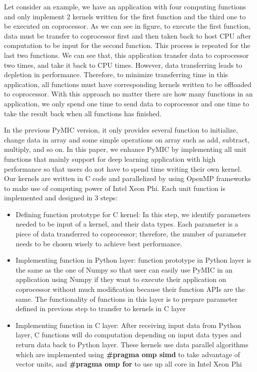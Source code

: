 Let consider an example, we have an application with four computing functions and only implement 2 kernels written for the first function and the third one to be executed on coprocessor. As we can see in figure, to execute the first function, data must be transfer to coprocessor first and then taken back to host CPU after computation to be input for the second function. This process is repeated for the last two functions. We can see that, this application transfer data to coprocessor two times, and take it back to CPU times. However, data transferring leads to depletion in performance. Therefore, to minimize transferring time in this application, all functions must have corresponding kernels written to be offloaded to coprocessor. With this approach no matter there are how many functions in an application, we only spend one time to send data to coprocessor and one time to take the result back when all functions has finished. 

In the previous PyMIC version, it only provides several function to initialize, change data in array and some simple operations on array such as add, subtract, multiply, and so on. In this paper, we enhance PyMIC by implementing all unit functions that mainly support for deep learning application with high performance  so that users do not have to spend time writing their own kernel. Our kernels are written in C code and parallelized by using OpenMP frameworks to make use of computing power of Intel Xeon Phi. Each unit function is implemented and designed in 3 steps:

\begin{itemize}
\item Defining function prototype for C kernel: In this step, we identify parameters needed to be input of a kernel, and their data types. Each parameter is a piece of data transferred to coprocessor; therefore, the number of parameter needs to be chosen wisely to achieve best performance.

\item Implementing function in Python layer: function prototype in Python layer is the same as the one of Numpy so that user can easily use PyMIC in an application using Numpy if they want to execute their application on coprocessor without much modification because their function APIs are the same. The functionality of functions in this layer is to prepare parameter defined in previous step to transfer to kernels in C layer  		
			
\item Implementing function in C layer: After receiving input data from Python layer, C functions will do computation depending on input data types and return data back to Python layer. These kernels use data parallel algorithms which are implemented using \textbf{\#pragma omp simd} to take advantage of vector units, and \textbf{\#pragma omp for} to use up all core in Intel Xeon Phi
\end{itemize}
